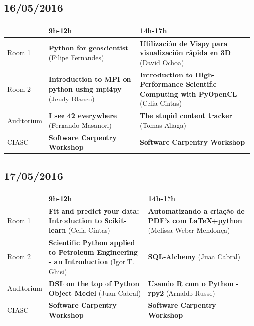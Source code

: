 \documentclass[12pt]{article}
\begin{document}
\newpage

\subsection*{16/05/2016}

\begin{center}
       \begin{tabular}{@{}l p{5cm} p{5cm}@{}}
     \toprule
      & 9h-12h & 14h-17h\\\midrule
     Room 1 & \textbf{Python for geoscientist} (Filipe Fernandes) & \textbf{Utilización de Vispy para visualización rápida en 3D} (David Ochoa)\\
     Room 2 & \textbf{Introduction to MPI on python using mpi4py} (Jeudy Blanco) & \textbf{Introduction to High-Performance Scientific Computing with PyOpenCL} (Celia Cintas)\\
     Auditorium & \textbf{I see 42 everywhere} (Fernando Masanori) & \textbf{The stupid content tracker} (Tomas Aliaga)\\
     CIASC & \textbf{Software Carpentry Workshop} & \textbf{Software Carpentry Workshop} \\\bottomrule
   \end{tabular}
\end{center}

\subsection*{17/05/2016}

\begin{center}
     \begin{tabular}{@{}l p{5cm} p{5cm}@{}}
     \toprule
      & 9h-12h & 14h-17h\\\midrule
     Room 1 & \textbf{Fit and predict your data: Introduction to Scikit-learn}
     (Celia Cintas) & \textbf{Automatizando a criação de PDF's com LaTeX+python} (Melissa Weber Mendonça)\\
     Room 2 & \textbf{Scientific Python applied to Petroleum Engineering - an
     Introduction} (Igor T. Ghisi) & \textbf{SQL-Alchemy} (Juan Cabral)\\
     Auditorium & \textbf{DSL on the top of Python Object Model} (Juan Cabral) & \textbf{Usando R com o Python - rpy2} (Arnaldo Russo)\\
     CIASC & \textbf{Software Carpentry Workshop} & \textbf{Software Carpentry Workshop} \\\bottomrule
   \end{tabular}
\end{center}
\end{document}

